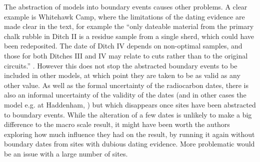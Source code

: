 The abstraction of models into boundary events causes other problems. A clear example is Whitehawk Camp, where the limitations of the dating evidence are made clear in the text, for example the ``only dateable material from the primary chalk rubble in Ditch II is a residue sample from a single sherd, which could have been redeposited. The date of Ditch IV depends on non-optimal samples, and those for both Ditches III and IV may relate to cuts rather than to the original circuits.'' \citep[226]{Whittle:2011kl}. However this does not stop the abstracted boundary events to be included in other models, at which point they are taken to be as valid as any other value. As well as the formal uncertainty of the radiocarbon dates, there is also an informal uncertainty of the validity of the dates (and in other cases the model e.g. at Haddenham, \citealp[277]{Whittle:2011kl}) but which disappears once sites have been abstracted to boundary events. While the alteration of a few dates is unlikely to make a big difference to the macro scale result, it might have been worth the authors exploring how much influence they had on the result, by running it again without boundary dates from sites with dubious dating evidence. More problematic would be an issue with a large number of sites.


